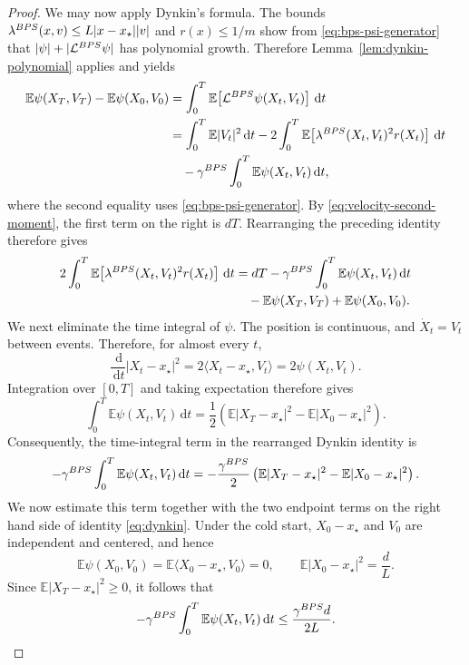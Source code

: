\documentclass[10pt,a4paper]{amsart}
\newcommand{\E}{\EE}
\newcommand{\EE}{\mathbb{E}}
\newcommand{\abs}[1]{\lvert#1\rvert}
\newcommand{\bps}{{\rm BPS}}
\newcommand{\dd}{\ud}
\newcommand{\ip}[2]{\langle #1,#2\rangle}
\newcommand{\ud}{\,\mathrm{d}}
\begin{document}
\begin{proof}
We may now apply Dynkin's formula.  The bounds
$\lambda^{\bps}(x,v)\le L\abs{x-x_\star}\abs v$ and
$r(x)\le1/m$ show from \eqref{eq:bps-psi-generator} that
$\abs\psi+\abs{\mathcal L^{\bps}\psi}$ has polynomial growth.  Therefore
Lemma~\ref{lem:dynkin-polynomial} applies and yields
\[
\begin{aligned}
        \E\psi(X_T,V_T)-\E\psi(X_0,V_0)
        & =\int_0^T
          \E\!\left[\mathcal L^{\bps}\psi(X_t,V_t)\right]\dd t \\
        &=\int_0^T\E\abs{V_t}^2\dd t
          -2\int_0^T\E\!\left[
            \lambda^{\bps}(X_t,V_t)^2r(X_t)
          \right]\dd t\\
        &\quad-\gamma^{\bps}
          \int_0^T\E\psi(X_t,V_t)\dd t,
\end{aligned}
\]
where the second equality uses  \eqref{eq:bps-psi-generator}.
By \eqref{eq:velocity-second-moment}, the first term on the right is $dT$.
Rearranging the preceding identity therefore gives
\begin{equation}\label{eq:dynkin}
\begin{aligned}
        2\int_0^T\E\!\left[
          \lambda^{\bps}(X_t,V_t)^2r(X_t)
        \right]\dd t
        &=dT-\gamma^{\bps}\int_0^T\E\psi(X_t,V_t)\dd t\\
        &\quad-\E\psi(X_T,V_T)+\E\psi(X_0,V_0).
\end{aligned}
\end{equation}
We next eliminate the time integral of $\psi$.  The position is continuous,
and $\dot X_t=V_t$ between events.  Therefore, for almost every $t$,
\[
        \frac{\dd}{\dd t}\abs{X_t-x_\star}^2
        =2\ip{X_t-x_\star}{V_t}
        =2\psi(X_t,V_t).
\]
Integration over $[0,T]$ and taking expectation therefore gives 
\[
        \int_0^T\E\psi(X_t,V_t)\dd t
        =\frac12\left(
          \E\abs{X_T-x_\star}^2-\E\abs{X_0-x_\star}^2
        \right).
\]
Consequently, the time-integral term in the rearranged Dynkin identity is
\[
        -\gamma^{\bps}\int_0^T\E\psi(X_t,V_t)\dd t
        =-\frac{\gamma^{\bps}}2
          \left(\E\abs{X_T-x_\star}^2-\E\abs{X_0-x_\star}^2\right).
\]
We now estimate this term together with the two endpoint terms on the right hand side of 
identity \eqref{eq:dynkin}. Under the cold start, $X_0-x_\star$ and $V_0$ are independent and centered, and hence
\[
        \E\psi(X_0,V_0)
        =\E\ip{X_0-x_\star}{V_0}=0,
        \qquad
        \E\abs{X_0-x_\star}^2=\frac dL.
\]
Since $\E\abs{X_T-x_\star}^2\ge0$, it follows that
\[
        -\gamma^{\bps}\int_0^T\E\psi(X_t,V_t)\dd t
        \le\frac{\gamma^{\bps}d}{2L}.
\]
\end{proof}
\end{document}
